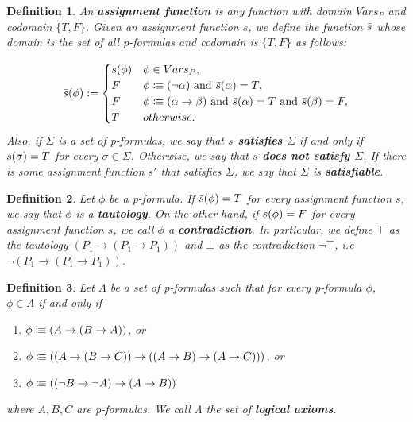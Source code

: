\documentclass[leqno]{article}
\newtheorem{definition}{Definition}[section]
\newcommand{\set}[1]{\{#1\}}
\newcommand{\is}{\colonequiv}
\newcommand{\limplies}{\rightarrow}
\begin{document}
\begin{definition}
    An \textbf{assignment function} is any function with domain $Vars_P$ and codomain $\set{T, F}$. Given an assignment function $s$, we define the function $\Bar{s}$ whose domain is the set of all p-formulas and codomain is $\set{T, F}$ as follows:
    
    \begin{equation*}
        \Bar{s}(\phi) := 
        \begin{cases}
        s(\phi) & \phi \in Vars_P, \\
        F & \phi \is (\neg \alpha) \text{ and } \Bar{s}(\alpha) = T,\\
        F & \phi \is (\alpha \limplies \beta) \text{ and } \Bar{s}(\alpha) = T \text{ and } \Bar{s}(\beta) = F,\\
        T & otherwise.
        \end{cases}
    \end{equation*} Also, if $\Sigma$ is a set of p-formulas, we say that \textbf{$s$ satisfies $\Sigma$} if and only if $\Bar{s}(\sigma) = T$ for every $\sigma \in \Sigma$. Otherwise, we say that \textbf{$s$ does not satisfy $\Sigma$}. If there is some assignment function $s'$ that satisfies $\Sigma$, we say that $\Sigma$ is \textbf{satisfiable}.
\end{definition}

\begin{definition}
    Let $\phi$ be a p-formula. If $\Bar{s}(\phi) = T$ for every assignment function $s$, we say that $\phi$ is a \textbf{tautology}. On the other hand, if $\Bar{s}(\phi) = F$ for every assignment function $s$, we call $\phi$ a \textbf{contradiction}. In particular, we define $\top$ as the tautology $(P_1 \limplies (P_1 \limplies P_1))$ and $\bot$ as the contradiction $\neg \top$, i.e $\neg (P_1 \limplies (P_1 \limplies P_1))$.
\end{definition}

\begin{definition}
    Let $\Lambda$ be a set of p-formulas such that for every p-formula $\phi$, $\phi \in \Lambda$ if and only if
    
    \begin{enumerate}
        \item $\phi \is (A \limplies (B \limplies A))$, or
        \item $\phi \is ((A \limplies (B \limplies C)) \limplies ((A \limplies B) \limplies (A \limplies C)))$, or
        \item $\phi \is ((\neg B \limplies \neg A) \limplies (A \limplies B))$
    \end{enumerate} where $A,B,C$ are p-formulas. We call $\Lambda$ the set of \textbf{logical axioms}.
\end{definition}
\end{document}

